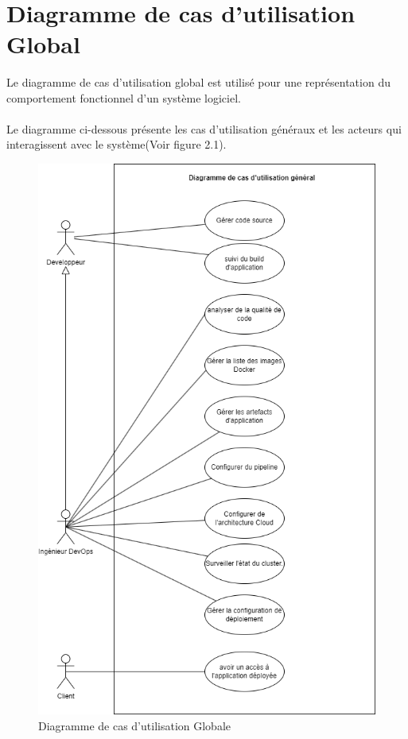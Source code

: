   \texttt{}\\[0.5cm]

\section{\Large  Diagramme de cas d'utilisation Global}


Le diagramme de cas d'utilisation global est utilisé pour une représentation du comportement fonctionnel d'un système logiciel.\\\texttt{}\\[0.01cm]
Le diagramme ci-dessous présente les cas d'utilisation généraux et les acteurs qui interagissent avec le système(Voir figure 2.1).
\begin{figure}[H]
  \begin{center}
  
      \includegraphics[width=12cm]{Use case.drawio.png}

  \end{center}
  
  \caption{Diagramme de cas d'utilisation Globale}
\end{figure}


